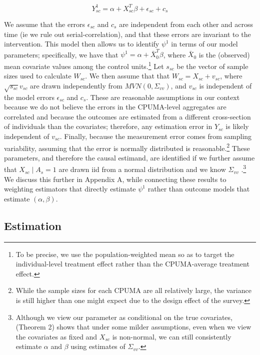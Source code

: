\documentclass[12pt]{article}
\begin{document}
$$
Y_{sc}^1 = \alpha + X_{sc}^T\beta + \epsilon_{sc} + c_s
$$

We assume that the errors $\epsilon_{sc}$ and $c_s$ are independent from each other and across time (ie we rule out serial-correlation), and that these errors are invariant to the intervention. This model then allows us to identify $\psi^1$ in terms of our model parameters; specifically, we have that $\psi^1 = \alpha + \bar{X}_0^T\beta$, where $\bar{X}_0$ is the (observed) mean covariate values among the control units.\footnote{To be precise, we use the population-weighted mean so as to target the individual-level treatment effect rather than the CPUMA-average treatment effect.} Let $s_{sc}$ be the vector of sample sizes used to calculate $W_{sc}$. We then assume that that $W_{sc} = X_{sc} + v_{sc}$, where $\sqrt{s_{sc}}v_{sc}$ are drawn independently from $MVN(0, \Sigma_{vv})$, and $v_{sc}$ is independent of the model errors $\epsilon_{sc}$ and $c_s$.  These are reasonable assumptions in our context because we do not believe the errors in the CPUMA-level aggregates are correlated and because the outcomes are estimated from a different cross-section of individuals than the covariates; therefore, any estimation error in $Y_{sc}$ is likely independent of $v_{sc}$. Finally, because the measurement error comes from sampling variability, assuming that the error is normally distributed is reasonable.\footnote{While the sample sizes for each CPUMA are all relatively large, the variance is still higher than one might expect due to the design effect of the survey.} These parameters, and therefore the causal estimand, are identified if we further assume that $X_{sc} \mid A_s = 1$ are drawn iid from a normal distribution and we know $\Sigma_{vv}$ \cite{gleser1992importance}.\footnote{Although we view our parameter as conditional on the true covariates, \cite{gleser1992importance} (Theorem 2) shows that under some milder assumptions, even when we view the covariates as fixed and $X_{sc}$ is non-normal, we can still consistently estimate $\alpha$ and $\beta$ using estimates of $\Sigma_{vv}$.} We discuss this further in Appendix A, while connecting these results to weighting estimators that directly estimate $\psi^1$ rather than outcome models that estimate $(\alpha, \beta)$. 

\subsection{Estimation}
\end{document}
